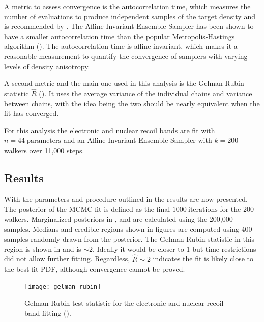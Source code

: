 A metric to assess convergence is the autocorrelation time, which measures the number
of evaluations to produce independent samples of the target density and is recommended by .  The Affine-Invariant
Ensemble Sampler has been shown to have a smaller autocorrelation time than the popular Metropolis-Hastings algorithm
().  The autocorrelation time is affine-invariant, which makes it a reasonable measurement to quantify
the convergence of samplers with varying levels of density anisotropy.

A second metric and the main one used in
this analysis is the Gelman-Rubin statistic $\hat{R}$ ().  It uses the average variance of the individual chains and
variance
between chains, with the idea being the two should be nearly equivalent when the fit has converged.

For this analysis the electronic and nuclear recoil bands are fit with  $n = 44\ \mathrm{parameters}$ and an Affine-Invariant Ensemble
Sampler with $k = 200$ walkers over 11,000 steps.



\subsection{Results}
\label{subsec:er_nr_calibrations_results}
With the parameters and procedure outlined in  the results are now
presented.  The posterior of the MCMC fit is defined as the final $1000\ \mathrm{iterations}$ for the 200 walkers.  Marginalized
posteriors in ,  and
 are calculated using the 200,000 samples.  Medians and credible regions shown in
figures are computed using 400 samples randomly drawn from the posterior.  The Gelman-Rubin statistic in this region is
shown in  and is ${\sim}2$.  Ideally it would be closer to 1 but time restrictions did not allow
further fitting.  Regardless, $\hat{R} \sim 2$ indicates
the fit is likely close to the best-fit PDF, although convergence cannot be proved.

\begin{figure}
\centering
\texttt{[image: gelman\_rubin]}
\caption{Gelman-Rubin test statistic for the electronic and nuclear recoil band fitting
().}
\label{fig:er_nr_calibrations_results_gr}
\end{figure}

